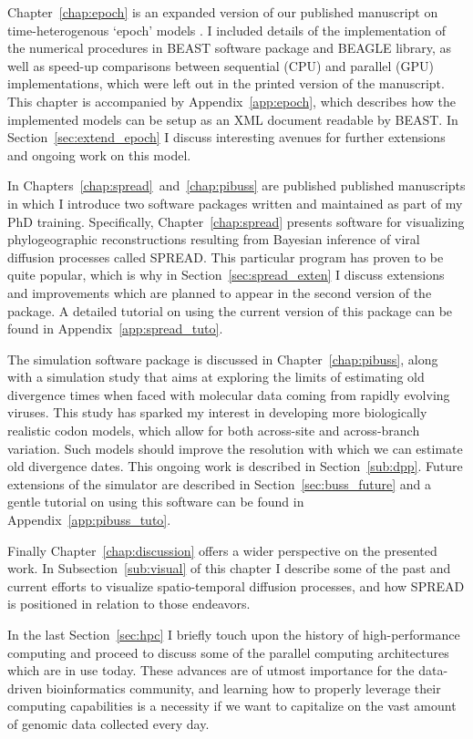 Chapter~\ref{chap:epoch} is an expanded version of our published manuscript on time-heterogenous `epoch' models \citep{Bielejec2014a}.
I included details of the implementation of the numerical procedures in BEAST software package and BEAGLE library, as well as speed-up comparisons between sequential (CPU) and parallel (GPU) implementations, which were left out in the printed version of the manuscript.
This chapter is accompanied by Appendix~\ref{app:epoch}, which describes how the implemented models can be setup as an XML document readable by BEAST.
In Section~\ref{sec:extend_epoch} I discuss interesting avenues for further extensions and ongoing work on this model.

In Chapters~\ref{chap:spread}~and~\ref{chap:pibuss} are published published manuscripts in which I introduce two software packages written and maintained as part of my PhD training.
Specifically, Chapter~\ref{chap:spread} presents software for visualizing phylogeographic reconstructions resulting from Bayesian inference of viral diffusion processes called SPREAD.
This particular program has proven to be quite popular, which is why in Section~\ref{sec:spread_exten} I discuss extensions and improvements which are planned to appear in the second version of the package.
A detailed tutorial on using the current version of this package can be found in Appendix~\ref{app:spread_tuto}.

The {\bussname} simulation software package is discussed in Chapter~\ref{chap:pibuss}, along with a simulation study that aims at exploring the limits of estimating old divergence times when faced with molecular data coming from rapidly evolving viruses.
This study has sparked my interest in developing more biologically realistic codon models, which allow for both across-site and across-branch variation.
Such models should improve the resolution with which we can estimate old divergence dates. %
This ongoing work is described in Section~\ref{sub:dpp}.
Future extensions of the {\bussname} simulator are described in Section~\ref{sec:buss_future} and a gentle tutorial on using this software can be found in Appendix~\ref{app:pibuss_tuto}.

Finally Chapter~\ref{chap:discussion} offers a wider perspective on the presented work. 
In Subsection~\ref{sub:visual} of this chapter I describe some of the past and current efforts to visualize spatio-temporal diffusion processes, and how SPREAD is positioned in relation to those endeavors.

In the last Section~\ref{sec:hpc} I briefly touch upon the history of high-performance computing and proceed to discuss some of the parallel computing architectures which are in use today. 
These advances are of utmost importance for the data-driven bioinformatics community, and learning how to properly leverage their computing capabilities is a necessity if we want to capitalize on the vast amount of genomic data collected every day.









